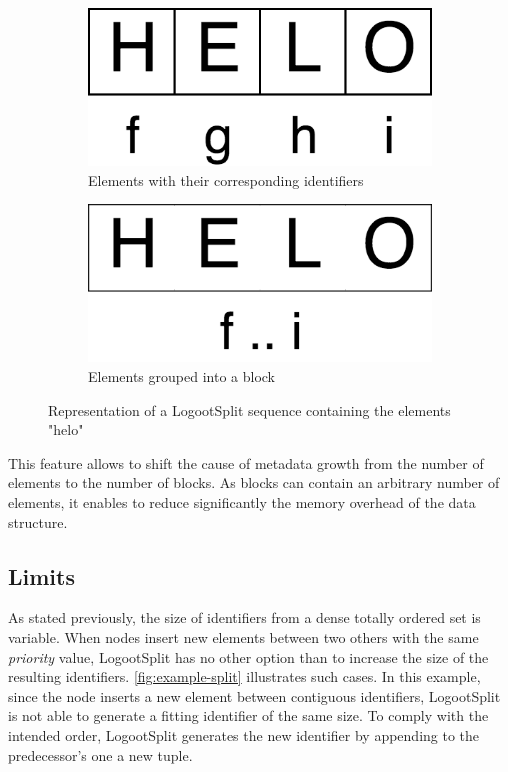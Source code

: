 \documentclass[sigplan,10pt]{acmart}
\begin{document}
\begin{figure}
    \begin{subfigure}{0.45\columnwidth}
        \centering
        \includegraphics[width=0.4\columnwidth]{img/helo-as-letters.png}
        \caption{Elements with their corresponding identifiers}
        \label{fig:logootsplit-seq-as-letters}
    \end{subfigure}
    \begin{subfigure}{0.45\columnwidth}
        \centering
        \includegraphics[width=0.4\columnwidth]{img/helo-as-block.png}
        \caption{Elements grouped into a block}
        \label{fig:logootsplit-seq-as-block}
    \end{subfigure}
    \caption{Representation of a LogootSplit sequence containing the elements "helo"}
    \label{fig:logootsplit-seq}
\end{figure}

This feature allows to shift the cause of metadata growth from the number of elements to the number of blocks.
As blocks can contain an arbitrary number of elements, it enables to reduce significantly the memory overhead of the data structure.

\subsection{Limits}

As stated previously, the size of identifiers from a dense totally ordered set is variable.
When nodes insert new elements between two others with the same \emph{priority} value, LogootSplit has no other option than to increase the size of the resulting identifiers.
\autoref{fig:example-split} illustrates such cases.
In this example, since the node inserts a new element between contiguous identifiers, LogootSplit is not able to generate a fitting identifier of the same size. To comply with the intended order, LogootSplit generates the new identifier by appending to the predecessor's one a new tuple.
\end{document}
